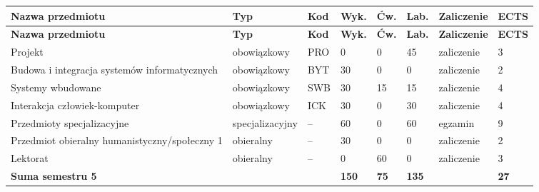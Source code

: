 \documentclass[12pt,a4paper]{article}
\newcommand{\thdrule}{\noalign{\global\setlength{\extrarowheight}{0pt}}}
\newcommand{\thdend}{\noalign{\global\setlength{\extrarowheight}{4pt}}}
\begin{document}
{\scriptsize
\begin{longtable}{m{5.0cm}m{1.9cm}m{0.75cm}m{0.85cm}m{0.85cm}m{0.85cm}m{1.45cm}m{0.9cm}}
\thdrule\toprule
\rowcolor{pjatkRed}
{\color{white}\footnotesize\textbf{\vphantom{Ag}Nazwa przedmiotu}} & {\color{white}\footnotesize\textbf{\vphantom{Ag}Typ}} & {\color{white}\footnotesize\textbf{\vphantom{Ag}Kod}} & {\color{white}\footnotesize\textbf{\vphantom{Ag}Wyk.}} & {\color{white}\footnotesize\textbf{\vphantom{Ag}Ćw.}} & {\color{white}\footnotesize\textbf{\vphantom{Ag}Lab.}} & {\color{white}\footnotesize\textbf{\vphantom{Ag}Zaliczenie}} & {\color{white}\footnotesize\textbf{\vphantom{Ag}ECTS}} \\
\midrule\thdend
\endfirsthead
\thdrule\toprule
\rowcolor{pjatkRed}
{\color{white}\footnotesize\textbf{\vphantom{Ag}Nazwa przedmiotu}} & {\color{white}\footnotesize\textbf{\vphantom{Ag}Typ}} & {\color{white}\footnotesize\textbf{\vphantom{Ag}Kod}} & {\color{white}\footnotesize\textbf{\vphantom{Ag}Wyk.}} & {\color{white}\footnotesize\textbf{\vphantom{Ag}Ćw.}} & {\color{white}\footnotesize\textbf{\vphantom{Ag}Lab.}} & {\color{white}\footnotesize\textbf{\vphantom{Ag}Zaliczenie}} & {\color{white}\footnotesize\textbf{\vphantom{Ag}ECTS}} \\
\midrule\thdend
\endhead
\rowcolor{tableRowLight} Projekt & {\scriptsize obowiązkowy} & PRO & 0 & 0 & 45 & {\scriptsize zaliczenie} & 3 \\
\rowcolor{tableRowAlt} Budowa i integracja systemów informatycznych & {\scriptsize obowiązkowy} & BYT & 30 & 0 & 0 & {\scriptsize zaliczenie} & 2 \\
\rowcolor{tableRowLight} Systemy wbudowane & {\scriptsize obowiązkowy} & SWB & 30 & 15 & 15 & {\scriptsize zaliczenie} & 4 \\
\rowcolor{tableRowAlt} Interakcja człowiek-komputer & {\scriptsize obowiązkowy} & ICK & 30 & 0 & 30 & {\scriptsize zaliczenie} & 4 \\
\rowcolor{tableElective} Przedmioty specjalizacyjne & {\scriptsize specjalizacyjny} & -- & 60 & 0 & 60 & {\scriptsize egzamin} & 9 \\
\rowcolor{tableElective} Przedmiot obieralny humanistyczny/społeczny 1 & {\scriptsize obieralny} & -- & 30 & 0 & 0 & {\scriptsize zaliczenie} & 2 \\
\rowcolor{tableElective} Lektorat & {\scriptsize obieralny} & -- & 0 & 60 & 0 & {\scriptsize zaliczenie} & 3 \\
\midrule[\heavyrulewidth]
\rowcolor{tableSummary} \textbf{Suma semestru 5} & & & \textbf{150} & \textbf{75} & \textbf{135} & & \textbf{27} \\
\bottomrule
\end{longtable}}
\end{document}
